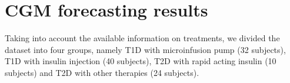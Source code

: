 %


\section{CGM forecasting results}
Taking into account the available information on treatments, we divided the dataset into four groups, namely T1D with microinfusion pump (32 subjects), T1D with insulin injection (40 subjects), T2D with rapid acting insulin (10 subjects) and T2D with other therapies (24 subjects).

